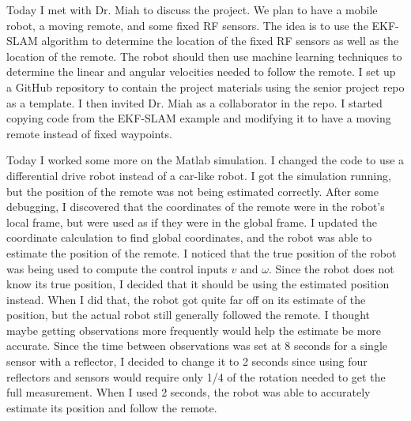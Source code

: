 \documentclass[fontsize=11pt, %
                             paper=letter, %
                             openany, %
                             captions=tableheading,
                             index=totoc,
                             hyperref]{labbook}
\begin{document}
\begin{addmargin}[0cm]{0cm} %

\pagestyle{scrheadings} %


%
Today I met with Dr. Miah to discuss the project. We plan to have a mobile robot, a moving remote, and some fixed RF sensors. The idea is to use the EKF-SLAM algorithm to determine the location of the fixed RF sensors as well as the location of the remote. The robot should then use machine learning techniques to determine the linear and angular velocities needed to follow the remote.
%
I set up a GitHub repository to contain the project materials using the senior project repo as a template. I then invited Dr. Miah as a collaborator in the repo.
%
I started copying code from the EKF-SLAM example and modifying it to have a moving remote instead of fixed waypoints.
%

%
Today I worked some more on the Matlab simulation. I changed the code to use a differential drive robot instead of a car-like robot. I got the simulation running, but the position of the remote was not being estimated correctly.
%
After some debugging, I discovered that the coordinates of the remote were in the robot's local frame, but were used as if they were in the global frame. I updated the coordinate calculation to find global coordinates, and the robot was able to estimate the position of the remote.
%
I noticed that the true position of the robot was being used to compute the control inputs $v$ and $\omega$. Since the robot does not know its true position, I decided that it should be using the estimated position instead. When I did that, the robot got quite far off on its estimate of the position, but the actual robot still generally followed the remote. I thought maybe getting observations more frequently would help the estimate be more accurate. Since the time between observations was set at 8 seconds for a single sensor with a reflector, I decided to change it to 2 seconds since using four reflectors and sensors would require only 1/4 of the rotation needed to get the full measurement. When I used 2 seconds, the robot was able to accurately estimate its position and follow the remote.


\end{addmargin}
\end{document}
